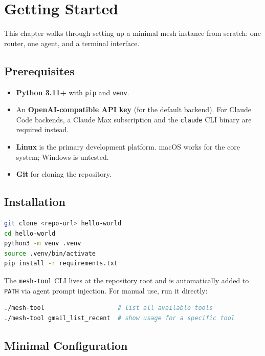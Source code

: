 \documentclass[11pt,letterpaper]{report}
\newcommand{\code}[1]{\texttt{#1}}
\begin{document}
\chapter{Getting Started}
\label{ch:getting-started}

This chapter walks through setting up a minimal mesh instance from
scratch: one router, one agent, and a terminal interface.

\section{Prerequisites}

\begin{itemize}[nosep]
  \item \textbf{Python 3.11+} with \code{pip} and \code{venv}.
  \item An \textbf{OpenAI-compatible API key} (for the default backend).
        For Claude Code backends, a Claude Max subscription and the
        \code{claude} CLI binary are required instead.
  \item \textbf{Linux} is the primary development platform. macOS works
        for the core system; Windows is untested.
  \item \textbf{Git} for cloning the repository.
\end{itemize}

\section{Installation}

\begin{lstlisting}[language=bash]
git clone <repo-url> hello-world
cd hello-world
python3 -m venv .venv
source .venv/bin/activate
pip install -r requirements.txt
\end{lstlisting}

The \code{mesh-tool} CLI lives at the repository root and is
automatically added to \code{PATH} via agent prompt injection.
For manual use, run it directly:

\begin{lstlisting}[language=bash]
./mesh-tool                    # list all available tools
./mesh-tool gmail_list_recent  # show usage for a specific tool
\end{lstlisting}

\section{Minimal Configuration}
\end{document}
